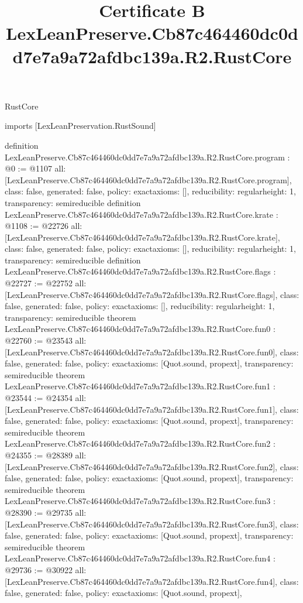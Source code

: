 \begin{lexlean}{RustCore}
\title{Certificate B LexLeanPreserve.Cb87c464460dc0dd7e7a9a72afdbc139a.R2.RustCore}
\begin{coremodule}
imports [LexLeanPreservation.RustSound]

definition LexLeanPreserve.Cb87c464460dc0dd7e7a9a72afdbc139a.R2.RustCore.program : @0 := @1107 {
  all: [LexLeanPreserve.Cb87c464460dc0dd7e7a9a72afdbc139a.R2.RustCore.program],
  class: false,
  generated: false,
  policy: exact{axioms: []},
  reducibility: regular{height: 1},
  transparency: semireducible
}
definition LexLeanPreserve.Cb87c464460dc0dd7e7a9a72afdbc139a.R2.RustCore.krate : @1108 := @22726 {
  all: [LexLeanPreserve.Cb87c464460dc0dd7e7a9a72afdbc139a.R2.RustCore.krate],
  class: false,
  generated: false,
  policy: exact{axioms: []},
  reducibility: regular{height: 1},
  transparency: semireducible
}
definition LexLeanPreserve.Cb87c464460dc0dd7e7a9a72afdbc139a.R2.RustCore.flags : @22727 := @22752 {
  all: [LexLeanPreserve.Cb87c464460dc0dd7e7a9a72afdbc139a.R2.RustCore.flags],
  class: false,
  generated: false,
  policy: exact{axioms: []},
  reducibility: regular{height: 1},
  transparency: semireducible
}
theorem LexLeanPreserve.Cb87c464460dc0dd7e7a9a72afdbc139a.R2.RustCore.fun0 : @22760 := @23543 {
  all: [LexLeanPreserve.Cb87c464460dc0dd7e7a9a72afdbc139a.R2.RustCore.fun0],
  class: false,
  generated: false,
  policy: exact{axioms: [Quot.sound, propext]},
  transparency: semireducible
}
theorem LexLeanPreserve.Cb87c464460dc0dd7e7a9a72afdbc139a.R2.RustCore.fun1 : @23544 := @24354 {
  all: [LexLeanPreserve.Cb87c464460dc0dd7e7a9a72afdbc139a.R2.RustCore.fun1],
  class: false,
  generated: false,
  policy: exact{axioms: [Quot.sound, propext]},
  transparency: semireducible
}
theorem LexLeanPreserve.Cb87c464460dc0dd7e7a9a72afdbc139a.R2.RustCore.fun2 : @24355 := @28389 {
  all: [LexLeanPreserve.Cb87c464460dc0dd7e7a9a72afdbc139a.R2.RustCore.fun2],
  class: false,
  generated: false,
  policy: exact{axioms: [Quot.sound, propext]},
  transparency: semireducible
}
theorem LexLeanPreserve.Cb87c464460dc0dd7e7a9a72afdbc139a.R2.RustCore.fun3 : @28390 := @29735 {
  all: [LexLeanPreserve.Cb87c464460dc0dd7e7a9a72afdbc139a.R2.RustCore.fun3],
  class: false,
  generated: false,
  policy: exact{axioms: [Quot.sound, propext]},
  transparency: semireducible
}
theorem LexLeanPreserve.Cb87c464460dc0dd7e7a9a72afdbc139a.R2.RustCore.fun4 : @29736 := @30922 {
  all: [LexLeanPreserve.Cb87c464460dc0dd7e7a9a72afdbc139a.R2.RustCore.fun4],
  class: false,
  generated: false,
  policy: exact{axioms: [Quot.sound, propext]},
}
\end{coremodule}
\end{lexlean}

